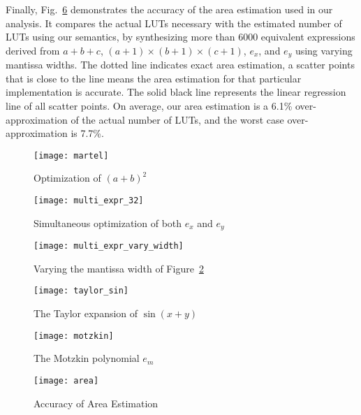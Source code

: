 Finally, Fig.~\ref{fig:area} demonstrates the accuracy of the area estimation
used in our analysis. It compares the actual LUTs necessary with the estimated
number of LUTs using our semantics, by synthesizing more than 6000 equivalent
expressions derived from $a + b + c$, $(a + 1) \times (b + 1) \times (c + 1)$,
$e_x$, and $e_y$ using varying mantissa widths. The dotted line indicates exact
area estimation, a scatter points that is close to the line means the area
estimation for that particular implementation is accurate. The solid black line
represents the linear regression line of all scatter points. On average, our
area estimation is a 6.1\% over-approximation of the actual number of LUTs, and
the worst case over-approximation is 7.7\%.
\newcommand{\figsize}{0.6}
\begin{figure}[ht]
    \centering
    \texttt{[image: martel]}
    \caption{Optimization of ${(a + b)}^2$}\label{fig:martel}
\end{figure}
\begin{figure}[ht]
    \centering
    \texttt{[image: multi\_expr\_32]}
    \caption{Simultaneous optimization of both $e_x$ and $e_y$}
    {}\label{fig:multi_expr_32}
\end{figure}
\begin{figure}[ht]
    \centering
    \texttt{[image: multi\_expr\_vary\_width]}
    \caption{Varying the mantissa width of Figure~\ref{fig:multi_expr_32}}
    {}\label{fig:multi_expr_vary_width}
\end{figure}
\begin{figure}[ht]
    \centering
    \texttt{[image: taylor\_sin]}
    \caption{The Taylor expansion of $\sin(x + y)$}
    {}\label{fig:taylor_sin}
\end{figure}
\begin{figure}[ht]
    \centering
    \texttt{[image: motzkin]}
    \caption{The Motzkin polynomial $e_m$}\label{fig:motzkin}
\end{figure}
\begin{figure}[ht]
    \centering
    \texttt{[image: area]}
    \caption{Accuracy of Area Estimation}\label{fig:area}
\end{figure}
